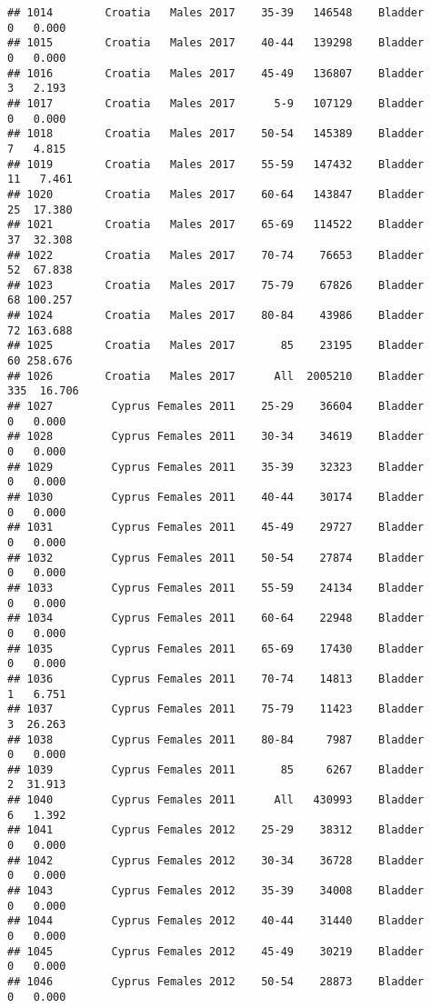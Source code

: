 \documentclass[
]{article}
\begin{document}
\begin{verbatim}
## 1014        Croatia   Males 2017    35-39   146548    Bladder      0   0.000
## 1015        Croatia   Males 2017    40-44   139298    Bladder      0   0.000
## 1016        Croatia   Males 2017    45-49   136807    Bladder      3   2.193
## 1017        Croatia   Males 2017      5-9   107129    Bladder      0   0.000
## 1018        Croatia   Males 2017    50-54   145389    Bladder      7   4.815
## 1019        Croatia   Males 2017    55-59   147432    Bladder     11   7.461
## 1020        Croatia   Males 2017    60-64   143847    Bladder     25  17.380
## 1021        Croatia   Males 2017    65-69   114522    Bladder     37  32.308
## 1022        Croatia   Males 2017    70-74    76653    Bladder     52  67.838
## 1023        Croatia   Males 2017    75-79    67826    Bladder     68 100.257
## 1024        Croatia   Males 2017    80-84    43986    Bladder     72 163.688
## 1025        Croatia   Males 2017       85    23195    Bladder     60 258.676
## 1026        Croatia   Males 2017      All  2005210    Bladder    335  16.706
## 1027         Cyprus Females 2011    25-29    36604    Bladder      0   0.000
## 1028         Cyprus Females 2011    30-34    34619    Bladder      0   0.000
## 1029         Cyprus Females 2011    35-39    32323    Bladder      0   0.000
## 1030         Cyprus Females 2011    40-44    30174    Bladder      0   0.000
## 1031         Cyprus Females 2011    45-49    29727    Bladder      0   0.000
## 1032         Cyprus Females 2011    50-54    27874    Bladder      0   0.000
## 1033         Cyprus Females 2011    55-59    24134    Bladder      0   0.000
## 1034         Cyprus Females 2011    60-64    22948    Bladder      0   0.000
## 1035         Cyprus Females 2011    65-69    17430    Bladder      0   0.000
## 1036         Cyprus Females 2011    70-74    14813    Bladder      1   6.751
## 1037         Cyprus Females 2011    75-79    11423    Bladder      3  26.263
## 1038         Cyprus Females 2011    80-84     7987    Bladder      0   0.000
## 1039         Cyprus Females 2011       85     6267    Bladder      2  31.913
## 1040         Cyprus Females 2011      All   430993    Bladder      6   1.392
## 1041         Cyprus Females 2012    25-29    38312    Bladder      0   0.000
## 1042         Cyprus Females 2012    30-34    36728    Bladder      0   0.000
## 1043         Cyprus Females 2012    35-39    34008    Bladder      0   0.000
## 1044         Cyprus Females 2012    40-44    31440    Bladder      0   0.000
## 1045         Cyprus Females 2012    45-49    30219    Bladder      0   0.000
## 1046         Cyprus Females 2012    50-54    28873    Bladder      0   0.000

\end{verbatim}
\end{document}
